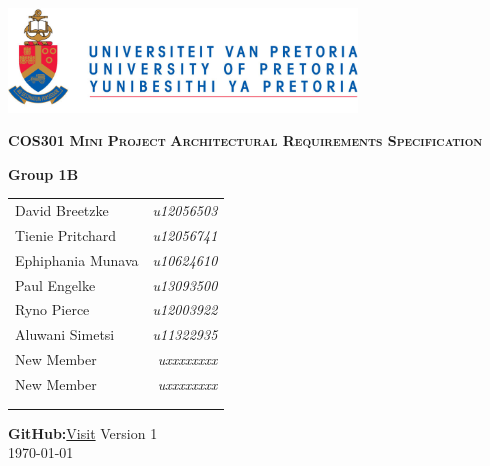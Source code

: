\begin{titlepage}
\begin{center}
\includegraphics[width=350px]{University_of_Pretoria_Logo.png}
\newline
\newline


\begin{flushright} \large
\textbf {\textsc{\LARGE COS301}}\newline
\textbf {\textsc{\LARGE Mini Project}}\newline
\textbf {\textsc{\LARGE Architectural Requirements Specification}}\newline
\end{flushright}



\textbf{Group 1B} \\

\vspace{0.5 cm}
\begin{tabular}{lr}
David Breetzke&\emph{u12056503} \\
Tienie Pritchard&\emph{u12056741} \\
Ephiphania Munava&\emph{u10624610} \\
Paul Engelke&\emph{u13093500} \\
Ryno Pierce&\emph{u12003922} \\
Aluwani Simetsi&\emph{u11322935} \\
New Member&\emph{uxxxxxxxx} \\
New Member&\emph{uxxxxxxxx} \\ 
\\
\\

\end{tabular}

\vspace{1cm}
\textbf{GitHub:}\href{https://github.com/davidbreetzke/COS_301_Phase2_1B}{Visit}
\vfill
{\large Version 1}
\\
{\large \today}

\end{center}
\end{titlepage}
